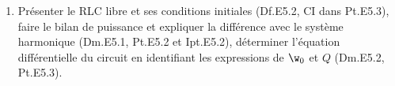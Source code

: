 \documentclass[a4paper, 11pt, final, garamond]{book}
\begin{document}
\begin{enumerate}
	\item Présenter le RLC libre et ses conditions initiales (Df.E5.2, CI dans
	      Pt.E5.3), faire le bilan de puissance et expliquer la différence avec le
	      système harmonique (Dm.E5.1, Pt.E5.2 et Ipt.E5.2), déterminer l'équation
	      différentielle du circuit en identifiant les expressions de $\w_0$ et $Q$
	      (Dm.E5.2, Pt.E5.3).
\end{enumerate}
\end{document}
